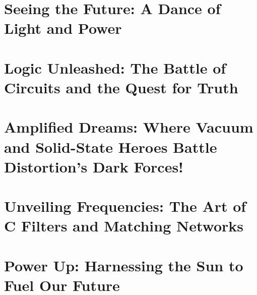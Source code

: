 \documentclass[12pt]{book}
\begin{document}
\section{Seeing the Future: A Dance of Light and Power}











\section{Logic Unleashed: The Battle of Circuits and the Quest for Truth}











\section{Amplified Dreams: Where Vacuum and Solid-State Heroes Battle Distortion's Dark Forces!}












\section{Unveiling Frequencies: The Art of C Filters and Matching Networks}











\section{Power Up: Harnessing the Sun to Fuel Our Future}















\end{document}
